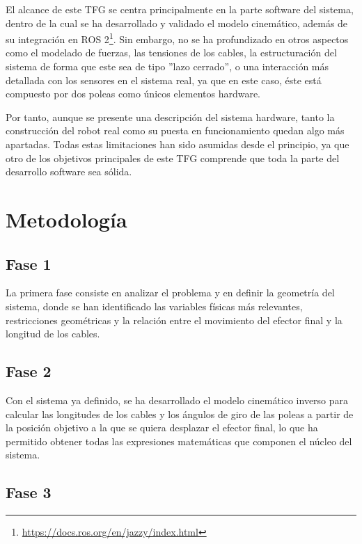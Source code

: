 El alcance de este TFG se centra principalmente en la parte software del sistema, dentro de la cual se ha desarrollado y validado el modelo cinemático, además de su integración en ROS 2\footnote{\url{https://docs.ros.org/en/jazzy/index.html}}. Sin embargo, no se ha profundizado en otros aspectos como el modelado de fuerzas, las tensiones de los cables, la estructuración del sistema de forma que este sea de tipo ”lazo cerrado”, o una interacción más detallada con los sensores en el sistema real, ya que en este caso, éste está compuesto por dos poleas como únicos elementos hardware.

\vspace{0.25cm}

Por tanto, aunque se presente una descripción del sistema hardware, tanto la construcción del robot real como su puesta en funcionamiento quedan algo más apartadas. Todas estas limitaciones han sido asumidas desde el principio, ya que otro de los objetivos principales de este TFG comprende que toda la parte del desarrollo software sea sólida.

\newpage

\section{Metodología}
\label{sec:segundaseccion}

\subsection{Fase 1}
\label{sec:terceraseccion}

La primera fase consiste en analizar el problema y en definir la geometría del sistema, donde se han identificado las variables físicas más relevantes, restricciones geométricas y la relación entre el movimiento del efector final y la longitud de los cables.

\subsection{Fase 2}
\label{sec:terceraseccion}

Con el sistema ya definido, se ha desarrollado el modelo cinemático inverso para calcular las longitudes de los cables y los ángulos de giro de las poleas a partir de la posición objetivo a la que se quiera desplazar el efector final, lo que ha permitido obtener todas las expresiones matemáticas que componen el núcleo del sistema.

\subsection{Fase 3}
\label{sec:terceraseccion}

